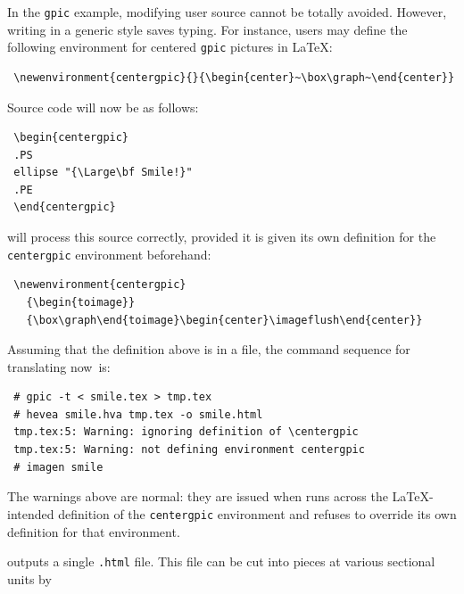In the \texttt{gpic} example, modifying user source cannot be totally avoided.
However, writing in a generic style saves typing.
For instance, users may define the following environment for
centered \texttt{gpic} pictures in \LaTeX{}:
\begin{verbatim}
 \newenvironment{centergpic}{}{\begin{center}~\box\graph~\end{center}}
\end{verbatim}
Source code will now be as follows:
\begin{verbatim}
 \begin{centergpic}
 .PS
 ellipse "{\Large\bf Smile!}"
 .PE
 \end{centergpic}
\end{verbatim}
\hevea{} will process this source correctly, provided it is given its
own definition for the \verb+centergpic+ environment beforehand:
\begin{verbatim}
 \newenvironment{centergpic}
   {\begin{toimage}}
   {\box\graph\end{toimage}\begin{center}\imageflush\end{center}}
\end{verbatim}
Assuming that the definition above is in a  file,
the command sequence for translating
 \mbox{now is}:
\begin{verbatim}
 # gpic -t < smile.tex > tmp.tex
 # hevea smile.hva tmp.tex -o smile.html
 tmp.tex:5: Warning: ignoring definition of \centergpic
 tmp.tex:5: Warning: not defining environment centergpic
 # imagen smile
\end{verbatim}
The warnings above are normal: they are issued when \hevea{} runs
across the \LaTeX{}-intended definition of the \verb+centergpic+
environment and refuses to override its own definition for that
environment.


\hevea{} outputs a single \texttt{.html} file. This file can be
cut into pieces at various sectional units by {\hacha}

